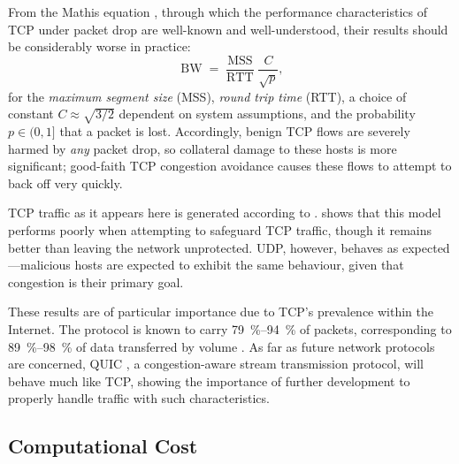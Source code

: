 \documentclass[conference, letterpaper, 10pt, times]{IEEEtran}
\begin{document}
From the Mathis equation \cite{DBLP:journals/ccr/MathisSMO97}, through which the performance characteristics of TCP under packet drop are well-known and well-understood, their results should be considerably worse in practice:
\begin{equation}
\operatorname{BW} = \frac{\operatorname{MSS}}{\operatorname{RTT}} \frac{C}{\sqrt{p}},
\end{equation}
for the \emph{maximum segment size} (MSS), \emph{round trip time} (RTT), a choice of constant $C \approx{} \sqrt{3/2}$ dependent on system assumptions, and the probability $p \in (0, 1]$ that a packet is lost.
Accordingly, benign TCP flows are severely harmed by \emph{any} packet drop, so collateral damage to these hosts is more significant; good-faith TCP congestion avoidance causes these flows to attempt to back off very quickly.

TCP traffic as it appears here is generated according to .
 shows that this model performs poorly when attempting to safeguard TCP traffic, though it remains better than leaving the network unprotected.
UDP, however, behaves as expected---malicious hosts are expected to exhibit the same behaviour, given that congestion is their primary goal.

These results are of particular importance due to TCP's prevalence within the Internet.
The protocol is known to carry \SIrange{79}{94}{\percent} of packets, corresponding to \SIrange{89}{98}{\percent} of data transferred by volume \cite{DBLP:conf/saint/ZhangDJC09}.
As far as future network protocols are concerned, QUIC \cite{DBLP:conf/sigcomm/LangleyRWVKZYKS17}, a congestion-aware stream transmission protocol, will behave much like TCP, showing the importance of further development to properly handle traffic with such characteristics.

\subsection{Computational Cost}
\end{document}
